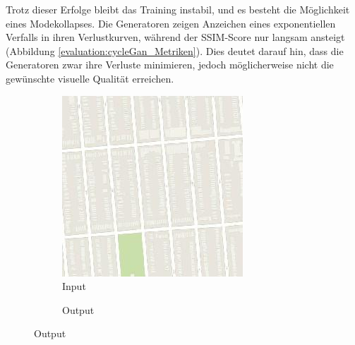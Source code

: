 Trotz dieser Erfolge bleibt das Training instabil, und es besteht die Möglichkeit eines Modekollapses. Die Generatoren zeigen Anzeichen eines exponentiellen Verfalls in ihren Verlustkurven, während der SSIM-Score nur langsam ansteigt (Abbildung \ref{evaluation:cycleGan_Metriken}). Dies deutet darauf hin, dass die Generatoren zwar ihre Verluste minimieren, jedoch möglicherweise nicht die gewünschte visuelle Qualität erreichen.\\

\begin{figure}
  \begin{subfigure}[t]{.2\textwidth}
    \caption{Input}
    \centering
    \includegraphics[width=\linewidth]{images/cycleGanResults/Maps10_Or_Ld120_E100_Lr0002.jpg}
  \end{subfigure}
  \begin{subfigure}[t]{.2\textwidth}
    \caption{Output}
    \centering

\end{subfigure}
\end{figure}
